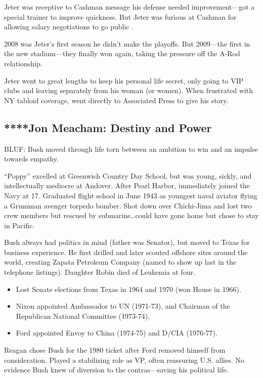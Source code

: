 \documentclass[
]{article}
\begin{document}
Jeter was receptive to Cashman message his defense needed
improvement---got a special trainer to improve quickness. But Jeter was
furious at Cashman for allowing salary negotiations to go public .

2008 was Jeter's first season he didn't make the playoffs. But
2009---the first in the new stadium---they finally won again, taking the
pressure off the A-Rod relationship.

Jeter went to great lengths to keep his personal life secret, only going
to VIP clubs and leaving separately from his woman (or women). When
frustrated with NY tabloid coverage, went directly to Associated Press
to give his story.

\hypertarget{jon-meacham-destiny-and-power}{%
\subsection{****Jon Meacham: Destiny and
Power}\label{jon-meacham-destiny-and-power}}

BLUF: Bush moved through life torn between an ambition to win and an
impulse towards empathy.

``Poppy'' excelled at Greenwich Country Day School, but was young,
sickly, and intellectually mediocre at Andover. After Pearl Harbor,
immediately joined the Navy at 17. Graduated flight school in June 1943
as youngest naval aviator flying a Grumman avenger torpedo bomber. Shot
down over Chichi-Jima and lost two crew members but rescued by
submarine\ldots could have gone home but chose to stay in Pacific.

Bush always had politics in mind (father was Senator), but moved to
Texas for business experience. He first drilled and later scouted
offshore sites around the world, creating Zapata Petroleum Company
(named to show up last in the telephone listings). Daughter Robin died
of Leukemia at four.

\begin{itemize}
\item
  Lost Senate elections from Texas in 1964 and 1970 (won House in 1966).
\item
  Nixon appointed Ambassador to UN (1971-73), and Chairman of the
  Republican National Committee (1973-74).
\item
  Ford appointed Envoy to China (1974-75) and D/CIA (1976-77).
\end{itemize}

Reagan chose Bush for the 1980 ticket after Ford removed himself from
consideration. Played a stabilizing role as VP, often reassuring U.S.
allies. No evidence Bush knew of diversion to the contras---saving his
political life.
\end{document}

